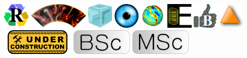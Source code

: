 \noindent
\includegraphics[height=1.25cm]{images/pictograms/replication}
\includegraphics[height=1.25cm]{images/pictograms/aspect_logo}
\includegraphics[height=1.25cm]{images/pictograms/ice}
\includegraphics[height=1.25cm]{images/pictograms/visualisation}
\includegraphics[height=1.25cm]{images/pictograms/gravity}
\includegraphics[height=1.25cm]{images/pictograms/elasticity}
\includegraphics[height=1.25cm]{images/pictograms/benchmark}
\includegraphics[height=1.25cm]{images/pictograms/triangle}
\includegraphics[height=1.25cm]{images/pictograms/under_construction}
\includegraphics[height=1.25cm]{images/pictograms/bsc}
\includegraphics[height=1.25cm]{images/pictograms/msc}
